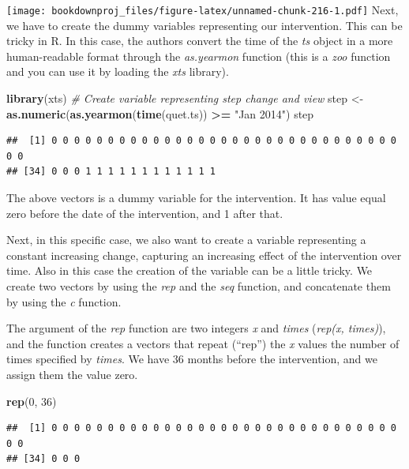 \documentclass[
]{article}
\newenvironment{Shaded}{\begin{snugshade}}{\end{snugshade}}
\newcommand{\CommentTok}[1]{\textcolor[rgb]{0.56,0.35,0.01}{\textit{#1}}}
\newcommand{\DecValTok}[1]{\textcolor[rgb]{0.00,0.00,0.81}{#1}}
\newcommand{\KeywordTok}[1]{\textcolor[rgb]{0.13,0.29,0.53}{\textbf{#1}}}
\newcommand{\NormalTok}[1]{#1}
\newcommand{\OperatorTok}[1]{\textcolor[rgb]{0.81,0.36,0.00}{\textbf{#1}}}
\newcommand{\StringTok}[1]{\textcolor[rgb]{0.31,0.60,0.02}{#1}}
\begin{document}
\texttt{[image: bookdownproj\_files/figure-latex/unnamed-chunk-216-1.pdf]}
Next, we have to create the dummy variables representing our intervention.
This can be tricky in R. In this case, the authors convert the time of the \emph{ts} object in a more human-readable format through the \emph{as.yearmon} function (this is a \emph{zoo} function and you can use it by loading the \emph{xts} library).

\begin{Shaded}
\begin{Highlighting}[]
\KeywordTok{library}\NormalTok{(xts)}
\CommentTok{# Create variable representing step change and view}
\NormalTok{step <-}\StringTok{ }\KeywordTok{as.numeric}\NormalTok{(}\KeywordTok{as.yearmon}\NormalTok{(}\KeywordTok{time}\NormalTok{(quet.ts)) }\OperatorTok{>=}\StringTok{ "Jan 2014"}\NormalTok{)}
\NormalTok{step}
\end{Highlighting}
\end{Shaded}

\begin{verbatim}
##  [1] 0 0 0 0 0 0 0 0 0 0 0 0 0 0 0 0 0 0 0 0 0 0 0 0 0 0 0 0 0 0 0 0 0
## [34] 0 0 0 1 1 1 1 1 1 1 1 1 1 1 1
\end{verbatim}

The above vectors is a dummy variable for the intervention. It has value equal zero before the date of the intervention, and 1 after that.

Next, in this specific case, we also want to create a variable representing a constant increasing change, capturing an increasing effect of the intervention over time.
Also in this case the creation of the variable can be a little tricky. We create two vectors by using the \emph{rep} and the \emph{seq} function, and concatenate them by using the \emph{c} function.

The argument of the \emph{rep} function are two integers \emph{x} and \emph{times} (\emph{rep(x, times)}), and the function creates a vectors that repeat (``rep'') the \emph{x} values the number of times specified by \emph{times}. We have 36 months before the intervention, and we assign them the value zero.

\begin{Shaded}
\begin{Highlighting}[]
\KeywordTok{rep}\NormalTok{(}\DecValTok{0}\NormalTok{, }\DecValTok{36}\NormalTok{)}
\end{Highlighting}
\end{Shaded}

\begin{verbatim}
##  [1] 0 0 0 0 0 0 0 0 0 0 0 0 0 0 0 0 0 0 0 0 0 0 0 0 0 0 0 0 0 0 0 0 0
## [34] 0 0 0
\end{verbatim}
\end{document}

